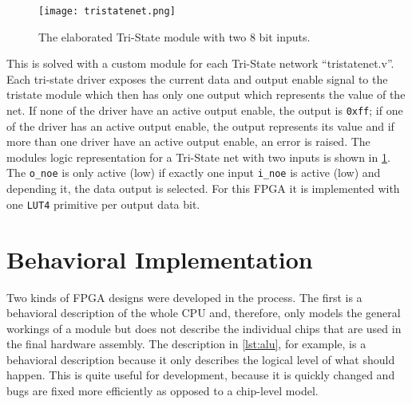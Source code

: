 \begin{figure}[t]
  \centering
  \texttt{[image: tristatenet.png]}
  \caption{The elaborated Tri-State module with two 8 bit inputs.}
  \label{fig:tristatenet}
\end{figure}
This is solved with a custom module for each Tri-State network ``tristatenet.v''.
Each tri-state driver exposes the current data and output enable signal to the tristate module which then has only one output which represents the value of the net.
If none of the driver have an active output enable, the output is \texttt{0xff}; if one of the driver has an active output enable, the output represents its value and if more than one driver have an active output enable, an error is raised.
The modules logic representation for a Tri-State net with two inputs is shown in \cref{fig:tristatenet}.
The \texttt{o\_noe} is only active (low) if exactly one input \texttt{i\_noe} is active (low) and depending it, the data output is selected.
For this \gls{FPGA} it is implemented with one \texttt{LUT4} primitive per output data bit.

\section{Behavioral Implementation}
Two kinds of \gls{FPGA} designs were developed in the process.
The first is a behavioral description of the whole \gls{CPU} and, therefore, only models the general workings of a module but does not describe the individual chips that are used in the final hardware assembly.
The description in \cref{lst:alu}, for example, is a behavioral description because it only describes the logical level of what should happen.
This is quite useful for development, because it is quickly changed and bugs are fixed more efficiently as opposed to a chip-level model.

